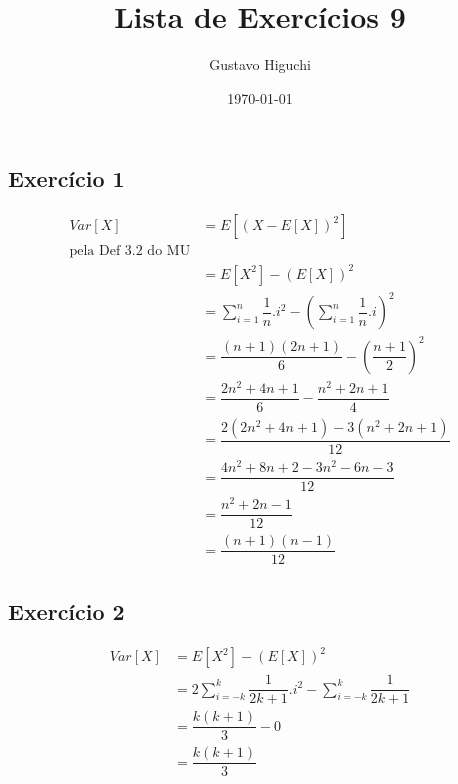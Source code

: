 \documentclass{article}
\title{Lista de Exercícios 9}
\author{Gustavo Higuchi}
\date{\today}
\begin{document}
\maketitle

\tableofcontents
\newpage


\chapter{}
\section{Exercício 1}
\hspace*{15pt}
\begin{equation}
	\begin{split}
		Var[X] &= E[(X-E[X])^2]\\
		\text{pela Def 3.2 do MU}&\\
		&= E[X^2] - (E[X])^2\\
		&= \sum\limits_{i=1}^{n}\dfrac{1}{n}.i^2 - \left(\sum\limits_{i=1}^{n}\dfrac{1}{n}.i\right)^2\\
		&= \dfrac{(n+1)(2n+1)}{6} - \left(\dfrac{n+1}{2}\right)^2\\
		&= \dfrac{2n^2 + 4n + 1}{6} - \dfrac{n^2 + 2n + 1}{4}\\
		&= \dfrac{2(2n^2 + 4n + 1) - 3(n^2 + 2n + 1)}{12}\\
		&= \dfrac{4n^2 + 8n + 2 - 3n^2 - 6n - 3}{12}\\
		&= \dfrac{n^2 + 2n - 1}{12}\\
		&= \dfrac{(n+1)(n-1)}{12}
	\end{split}
\end{equation}

\section{Exercício 2}
\begin{equation}
	\begin{split}
		Var[X] &= E[X^2] - (E[X])^2\\
		&= 2\sum\limits_{i=-k}^{k}\dfrac{1}{2k+1}.i^2 - \sum\limits_{i=-k}^{k}\dfrac{1}{2k+1}\\
		&= \dfrac{k(k+1)}{3} - 0 \\
		&= \dfrac{k(k+1)}{3}
	\end{split}
\end{equation}
\end{document}
